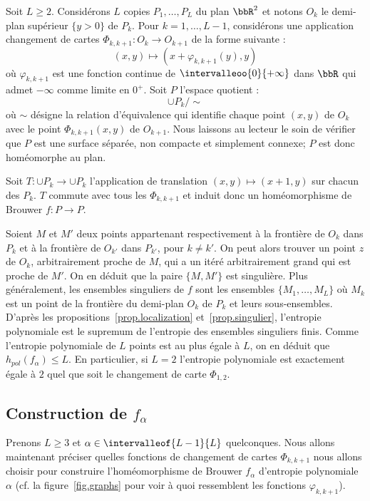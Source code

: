 Soit $L \geq 2$. Considérons $L$ copies $P_{1}, \dots, P_{L}$ du plan $\bbR^2$ et notons $O_{k}$ le demi-plan supérieur $\{y>0\}$ de $P_{k}$. Pour $k=1, \dots, L-1$, {considérons une application \og changement de cartes\fg{} $\Phi_{k,k+1}: O_{k} \to O_{k+1}$ de la forme suivante} :
\[
(x,y) \longmapsto (x+\varphi_{k,k+1}(y), y)
\]
où $\varphi_{k,k+1}$ est une fonction continue de $\intervalleoo{0}{+\infty}$ dans $\bbR$ qui admet $-\infty$ comme limite en $0^+$. Soit $P$ l'espace quotient :
\[
\cup P_{k} / \sim
\]
où $\sim$ désigne la relation d'équivalence qui identifie {chaque point} $(x,y)$ de $O_k$ avec le point $\Phi_{k,k+1}(x,y)$ de $O_{k+1}$. Nous laissons au lecteur le soin de vérifier que $P$ est une surface séparée, non compacte et simplement connexe; $P$ est donc homéomorphe au plan.

Soit $T : \cup P_{k} \to \cup P_{k}$ l'application de translation $(x,y) \mapsto (x+1,y)$ sur chacun des $P_{k}$. $T$ commute avec tous les $\Phi_{k,k+1}$ et induit donc un homéomorphisme de Brouwer $f: P \to P$.

{Soient $M$ et $M'$ deux points appartenant respectivement à la frontière de $O_{k}$ dans $P_{k}$ et à la frontière de $O_{k'}$ dans $P_{k'}$, pour $k
\neq k'$. On peut alors trouver un point $z$ de $O_{k}$, arbitrairement proche de $M$, qui a un itéré arbitrairement grand qui est proche de $M'$. On en déduit que la paire $\{M,M'\}$ est singulière. Plus généralement,} les ensembles singuliers de $f$ sont les ensembles $\{M_1, \dots, M_L\}$ où $M_k$ est un point de la frontière du demi-plan $O_{k}$ de $P_k$ et leurs sous-ensembles. D'après les propositions~\ref{prop.localization} et~\ref{prop.singulier}, l'entropie polynomiale est le supremum de l'entropie des ensembles singuliers finis. Comme l'entropie polynomiale de $L$ points est {au plus égale} à $L$, on en déduit que $h_{pol}(f_{\alpha}) \leq L$. En particulier, si $L=2$ l'entropie polynomiale est exactement égale à $2$ quel que soit le changement de carte $\Phi_{1,2}$.

\subsection{Construction de \texorpdfstring{$f_\alpha$}{falpha}}

Prenons $L \geq 3$ et $\alpha \in \intervalleof{L-1}{L}$ quelconques. Nous allons maintenant préciser quelles fonctions de changement de cartes $\Phi_{k,k+1}$ nous allons choisir pour construire l'homéomorphisme de Brouwer $f_\alpha$ d'entropie polynomiale $\alpha$ (cf. la figure~\ref{fig.graphs} pour voir à quoi ressemblent les fonctions $\varphi_{k,k+1}$).

